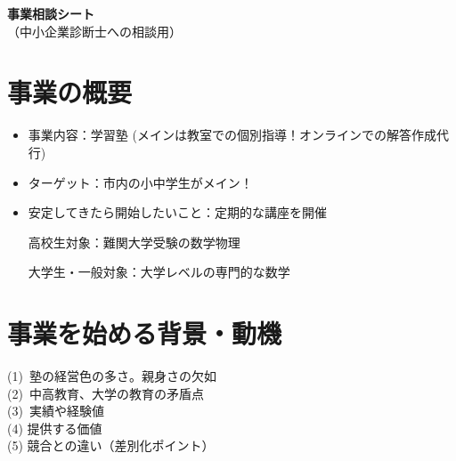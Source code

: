 ﻿\documentclass[12pt]{article}
\begin{document}
\begin{center}
    {\LARGE \bf 事業相談シート} \\
    \vspace{2mm}
    （中小企業診断士への相談用）
\end{center}

\vspace{1mm}

\section{事業の概要}
\begin{itemize}[leftmargin=1.5em, parsep=4pt]
  \item 事業内容：学習塾 (メインは教室での個別指導！オンラインでの解答作成代行)
  \item ターゲット：市内の小中学生がメイン！
  \item 安定してきたら開始したいこと：定期的な講座を開催
  
  高校生対象：難関大学受験の数学物理
  
  大学生・一般対象：大学レベルの専門的な数学
\end{itemize}

\section{事業を始める背景・動機}
(1)\ 塾の経営色の多さ。親身さの欠如\\

(2)\ 中高教育、大学の教育の矛盾点\\

(3)\ 実績や経験値\\

(4) 提供する価値\\

(5) 競合との違い（差別化ポイント）\\
\end{document}
